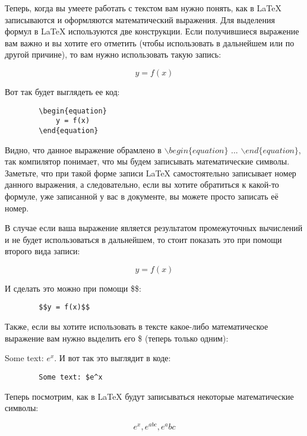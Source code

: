     Теперь, когда вы умеете работать с текстом вам нужно понять, как в \LaTeX{} записываются и оформляются математический выражения. Для выделения формул в \LaTeX{} используются две конструкции. Если получившиеся выражение вам важно и вы хотите его отметить (чтобы использовать в дальнейшем или по другой причине), то вам нужно использовать такую запись:
    
    \begin{equation}
        y = f(x)
    \end{equation}
    
    Вот так будет выглядеть ее код:    
    
    \begin{verbatim}
        \begin{equation}
            y = f(x)
        \end{equation}
    \end{verbatim}   
    
    Видно, что данное выражение обрамлено в $\backslash begin\{equation\}$ ... $\backslash end\{equation\}$, так компилятор понимает, что мы будем записывать математические символы. Заметьте, что при такой форме записи \LaTeX{} самостоятельно записывает номер данного выражения, а следовательно, если вы хотите обратиться к какой-то формуле, уже записанной у вас в документе, вы можете просто записать её номер.
    
    В случае если ваша выражение является результатом промежуточных вычислений и не будет использоваться в дальнейшем, то стоит показать это при помощи второго вида записи:
    
    $$y = f(x)$$    
    
    И сделать это можно при помощи \$\$:    
    
    \begin{verbatim}
        $$y = f(x)$$
    \end{verbatim}
    
    Также, если вы хотите использовать в тексте какое-либо математическое выражение вам нужно выделить его \$ (теперь только одним):

    Some text: $e^x$. И вот так это выглядит в коде:
    
    \begin{verbatim}
        Some text: $e^x
    \end{verbatim}
    
    Теперь посмотрим, как в \LaTeX{} будут записываться некоторые математические символы:
    
    $$e^x, e^{abc}, e^abc$$
        
